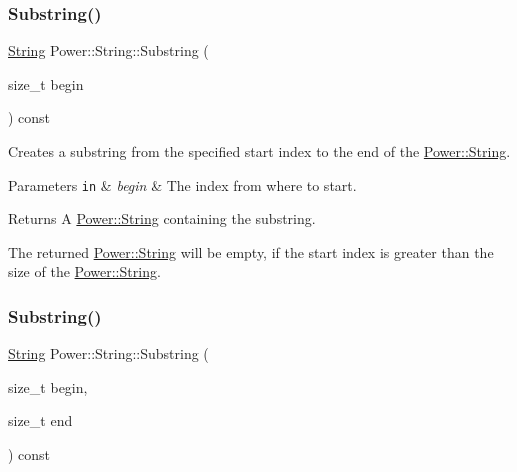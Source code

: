\subsubsection{\texorpdfstring{Substring()}{Substring()}\hspace{0.1cm}{\footnotesize\ttfamily [1/2]}}
{\footnotesize\ttfamily \hyperlink{class_power_1_1_string}{String} Power\+::\+String\+::\+Substring (\begin{DoxyParamCaption}\item[{size\+\_\+t}]{begin }\end{DoxyParamCaption}) const\hspace{0.3cm}{\ttfamily [inline]}}



Creates a substring from the specified start index to the end of the \hyperlink{class_power_1_1_string}{Power\+::\+String}. 


\begin{DoxyParams}[1]{Parameters}
\mbox{\tt in}  & {\em begin} & The index from where to start. \\
\hline
\end{DoxyParams}
\begin{DoxyReturn}{Returns}
A \hyperlink{class_power_1_1_string}{Power\+::\+String} containing the substring. 

The returned \hyperlink{class_power_1_1_string}{Power\+::\+String} will be empty, if the start index is greater than the size of the \hyperlink{class_power_1_1_string}{Power\+::\+String}. 
\end{DoxyReturn}
\mbox{\label{class_power_1_1_string_a648cd16b1af13b87a20d623d933f067c}} 
\subsubsection{\texorpdfstring{Substring()}{Substring()}\hspace{0.1cm}{\footnotesize\ttfamily [2/2]}}
{\footnotesize\ttfamily \hyperlink{class_power_1_1_string}{String} Power\+::\+String\+::\+Substring (\begin{DoxyParamCaption}\item[{size\+\_\+t}]{begin,  }\item[{size\+\_\+t}]{end }\end{DoxyParamCaption}) const\hspace{0.3cm}{\ttfamily [inline]}}



